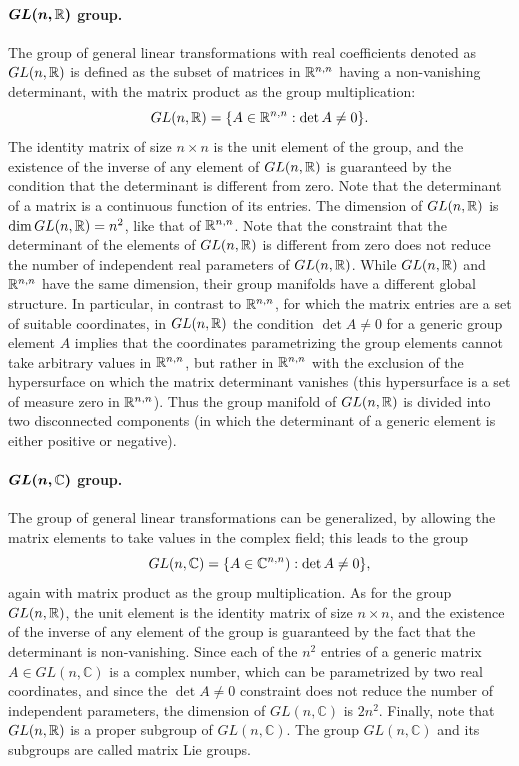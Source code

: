 \paragraph{$\bm{GL(n,\mathbb{R})}$ group.} The group of general linear transformations with real coefficients denoted as $GL(n, \mathbb{R})$ is defined as the subset of matrices in $\mathbb{R}^{n,n}$ having a non-vanishing determinant, with the matrix product as the group multiplication:
    \begin{equation}
        GL(n, \mathbb{R}) = \{ A \in \mathbb{R}^{n,n} : \det A \neq 0 \}.
    \end{equation}
    The identity matrix of size $n \times n$ is the unit element of the group, and the existence of the inverse of any element of $GL(n, \mathbb{R})$ is guaranteed by the condition that the determinant is different from zero. Note that the determinant of a matrix is a continuous function of its entries. The dimension of $GL(n, \mathbb{R})$ is $\dim GL(n, \mathbb{R}) = n^2$, like that of $\mathbb{R}^{n,n}$. Note that the constraint that the determinant of the elements of $GL(n, \mathbb{R})$ is different from zero does not reduce the number of independent real parameters of $GL(n, \mathbb{R})$. While $GL(n, \mathbb{R})$ and $\mathbb{R}^{n,n}$ have the same dimension, their group manifolds have a different global structure. In particular, in contrast to $\mathbb{R}^{n,n}$, for which the matrix entries are a set of suitable coordinates, in $GL(n, \mathbb{R})$ the condition $\det A \neq 0$ for a generic group element $A$ implies that the coordinates parametrizing the group elements cannot take arbitrary values in $\mathbb{R}^{n,n}$, but rather in $\mathbb{R}^{n,n}$ with the exclusion of the hypersurface on which the matrix determinant vanishes (this hypersurface is a set of measure zero in $\mathbb{R}^{n,n}$). Thus the group manifold of $GL(n, \mathbb{R})$ is divided into two disconnected components (in which the determinant of a generic element is either positive or negative).

\paragraph{$\bm{GL(n,\mathbb{C})}$ group.} The group of general linear transformations can be generalized, by allowing the matrix elements to take values in the complex field; this leads to the group
    \begin{equation}
        GL(n, \mathbb{C}) = \{ A \in\mathbb{C}^{n,n}) : \det A \neq 0 \},
    \end{equation}
    again with matrix product as the group multiplication. As for the group $GL(n, \mathbb{R})$, the unit element is the identity matrix of size $n \times n$, and the existence of the inverse of any element of the group is guaranteed by the fact that the determinant is non-vanishing. Since each of the $n^2$ entries of a generic matrix $A \in GL(n, \mathbb{C})$ is a complex number, which can be parametrized by two real coordinates, and since the $\det A \neq 0$ constraint does not reduce the number of independent parameters, the dimension of $GL(n, \mathbb{C})$ is $2n^2$. Finally, note that $GL(n, \mathbb{R})$ is a proper subgroup of $GL(n, \mathbb{C})$. The group $GL(n, \mathbb{C})$ and its subgroups are called matrix Lie groups.

